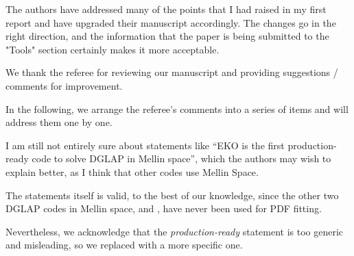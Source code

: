 \documentclass[a4paper,11pt]{article}
\newcounter{comment}[section]
\begin{document}
 


\begin{response}{
  The authors have addressed many of the points that I had raised in my first
  report and have upgraded their manuscript accordingly. The changes go in the
  right direction, and the information that the paper is being submitted to the
  "Tools" section certainly makes it more acceptable.
}

We thank the referee for reviewing our manuscript and providing suggestions / comments for improvement.

In the following, we arrange the referee's comments into a series of items and 
will address them one by one.
\end{response}

\begin{response}{
  I am still not entirely sure about statements like ``EKO is the first
  production-ready code to solve DGLAP in Mellin space'', which the authors may
  wish to explain better, as I think that other codes use Mellin Space.
}

The statements itself is valid, to the best of our knowledge, since the other
two DGLAP codes in Mellin space,
\href{https://www.nikhef.nl/~avogt/pegasus.html}{\pegasus{}} and
\href{https://github.com/vbertone/MELA}{\mela{}}, have never been used for PDF
fitting.

Nevertheless, we acknowledge that the \textit{production-ready} statement is
too generic and misleading, so we replaced with a more specific one.
\end{response}
\end{document}
